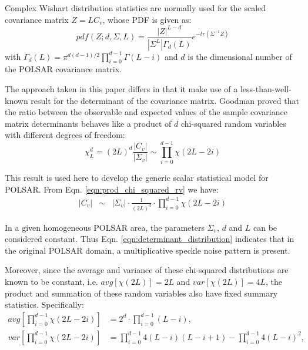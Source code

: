 \documentclass[journal]{IEEEtran}
\begin{document}
Complex Wishart distribution statistics are normally used for the scaled covariance matrix
$Z=LC_v$, whose PDF is given as:
\begin{equation}
  pdf(Z;d,\Sigma,L)=\frac{|Z|^{L-d}}{|\Sigma^L|\Gamma_d(L)}e^{-tr(\Sigma^{-1}Z)}
\end{equation}
with $\Gamma_d(L) = \pi^{d(d-1)/2} \prod^{d-1}_{i=0}\Gamma(L-i)$
and $d$ is the dimensional number of the POLSAR covariance matrix.

The approach taken in this paper differs 
  in that it make use of 
  a less-than-well-known result for the determinant of the covariance matrix.
Goodman \cite{Goodman_1963_AMS_178} proved
that the ratio between the observable and expected values of the sample covariance matrix determinants
  behaves like a product of $d$ chi-squared random variables with different degrees of freedom: 
\begin{equation}
\chi^d_L = (2L)^d \frac{|C_v|}{|\Sigma_v|} \sim \prod_{i=0}^{d-1} \chi (2L-2i)
\label{eqn:prod_chi_squared_rv}  
\end{equation}

This result is used here to develop the generic scalar statistical model for POLSAR. %
From Eqn. \ref{eqn:prod_chi_squared_rv} %
we have: %
\begin{eqnarray}
  |C_v| &\sim& |\Sigma_v| \cdot \frac{1}{(2L)^d} \cdot \prod_{i=0}^{d-1} \chi (2L-2i) \label{eqn:determinant_distribution} %
\end{eqnarray}

In a given homogeneous POLSAR area, the parameters $\Sigma_v$, $d$ and $L$ can be considered constant.
Thus Eqn. \ref{eqn:determinant_distribution} indicates that 
  in the original POLSAR domain, a multiplicative speckle noise pattern is present.

Moreover, since the average and variance of these chi-squared distributions %
  are known to be constant, i.e. $avg \left[ \chi(2L) \right] = 2L$ and $var \left[ \chi(2L) \right] = 4L$,
  the product and summation of these random variables also have fixed summary statistics.
Specifically:
{\footnotesize
\begin{align*}
  avg \left[ \prod^{d-1}_{i=0} \chi(2L-2i) \right] &= 2^d \cdot \prod^{d-1}_{i=0} (L-i), \\
  var \left[ \prod^{d-1}_{i=0} \chi(2L-2i) \right] &= \prod^{d-1}_{i=0} 4(L-i)(L-i+1) - \prod^{d-1}_{i=0} 4(L-i)^2, %
\end{align*}
}
\end{document}
